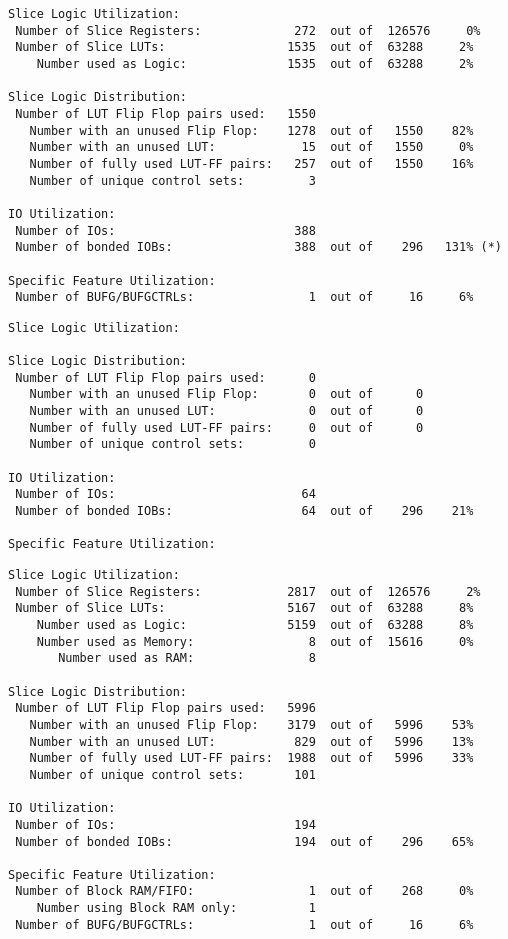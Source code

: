 \begin{verbatim}
Slice Logic Utilization: 
 Number of Slice Registers:             272  out of  126576     0%  
 Number of Slice LUTs:                 1535  out of  63288     2%  
    Number used as Logic:              1535  out of  63288     2%  

Slice Logic Distribution: 
 Number of LUT Flip Flop pairs used:   1550
   Number with an unused Flip Flop:    1278  out of   1550    82%  
   Number with an unused LUT:            15  out of   1550     0%  
   Number of fully used LUT-FF pairs:   257  out of   1550    16%  
   Number of unique control sets:         3

IO Utilization: 
 Number of IOs:                         388
 Number of bonded IOBs:                 388  out of    296   131% (*) 

Specific Feature Utilization:
 Number of BUFG/BUFGCTRLs:                1  out of     16     6%  
\end{verbatim}

\begin{verbatim}
Slice Logic Utilization: 

Slice Logic Distribution: 
 Number of LUT Flip Flop pairs used:      0
   Number with an unused Flip Flop:       0  out of      0         
   Number with an unused LUT:             0  out of      0         
   Number of fully used LUT-FF pairs:     0  out of      0         
   Number of unique control sets:         0

IO Utilization: 
 Number of IOs:                          64
 Number of bonded IOBs:                  64  out of    296    21%  

Specific Feature Utilization:
\end{verbatim}

\begin{verbatim}
Slice Logic Utilization: 
 Number of Slice Registers:            2817  out of  126576     2%  
 Number of Slice LUTs:                 5167  out of  63288     8%  
    Number used as Logic:              5159  out of  63288     8%  
    Number used as Memory:                8  out of  15616     0%  
       Number used as RAM:                8

Slice Logic Distribution: 
 Number of LUT Flip Flop pairs used:   5996
   Number with an unused Flip Flop:    3179  out of   5996    53%  
   Number with an unused LUT:           829  out of   5996    13%  
   Number of fully used LUT-FF pairs:  1988  out of   5996    33%  
   Number of unique control sets:       101

IO Utilization: 
 Number of IOs:                         194
 Number of bonded IOBs:                 194  out of    296    65%  

Specific Feature Utilization:
 Number of Block RAM/FIFO:                1  out of    268     0%  
    Number using Block RAM only:          1
 Number of BUFG/BUFGCTRLs:                1  out of     16     6%  
\end{verbatim}

